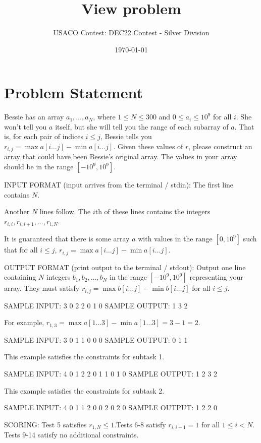 \documentclass[12pt]{article}
\title{View problem}
\author{USACO Contest: DEC22 Contest - Silver Division}
\date{\today}
\begin{document}
\maketitle

\section*{Problem Statement}

Bessie has an array $a_1, \ldots, a_N$, where $1 \leq N \leq 300$ and
$0 \leq a_i \leq 10^9$ for all $i$. She won't tell you $a$ itself, but she will
tell you the range of each subarray of $a$. That is, for each pair of indices
$i \leq j$, Bessie tells you $r_{i, j} = \max a[i\ldots j] - \min a[i\ldots j]$.
Given these values of $r$, please construct an array that could have been
Bessie's original array. The values in your array should be in the range
$[-10^9, 10^9]$.

INPUT FORMAT (input arrives from the terminal / stdin):
The first line contains $N$.

Another $N$ lines follow. The $i$th of these lines contains the integers
$r_{i, i}, r_{i, i + 1}, \ldots, r_{i, N}$.

It is guaranteed that there is some array $a$ with values in the range
$[0, 10^9]$ such that for all $i \leq j$,
$r_{i, j} = \max a[i\ldots j] - \min a[i\ldots j]$. 

OUTPUT FORMAT (print output to the terminal / stdout):
Output one line containing $N$ integers $b_1, b_2, \ldots, b_N$ in the range
$[-10^9, 10^9]$ representing your array. They must satisfy
$r_{i, j} = \max b[i\ldots j] - \min b[i\ldots j]$ for all $i \leq j$.

SAMPLE INPUT:
3
0 2 2
0 1
0
SAMPLE OUTPUT: 
1 3 2

For example, $r_{1, 3} = \max a[1\ldots 3] - \min a[1\ldots 3] = 3 - 1 = 2$.

SAMPLE INPUT:
3
0 1 1
0 0
0
SAMPLE OUTPUT: 
0 1 1

This example satisfies the constraints for subtask 1.

SAMPLE INPUT:
4
0 1 2 2
0 1 1
0 1
0
SAMPLE OUTPUT: 
1 2 3 2

This example satisfies the constraints for subtask 2.

SAMPLE INPUT:
4
0 1 1 2
0 0 2
0 2
0
SAMPLE OUTPUT: 
1 2 2 0

SCORING:
Test 5 satisfies $r_{1,N} \leq 1$.Tests 6-8 satisfy $r_{i,i+1} = 1$ for all $1 \leq i < N$. Tests 9-14 satisfy no additional constraints.
\end{document}
